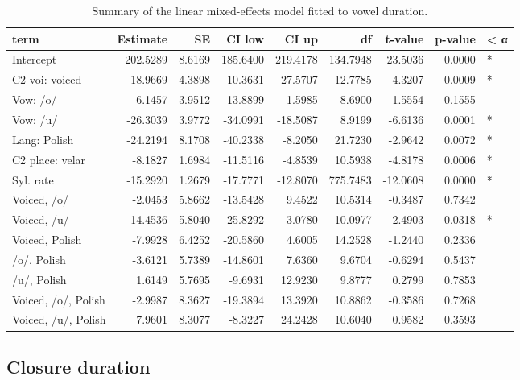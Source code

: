 \documentclass[preprint]{JASAnew}
\begin{document}
\begin{table}

\caption{\label{tab:vow-table}Summary of the linear mixed-effects model fitted to vowel duration.}
\centering
\begin{tabular}[t]{lrrrrrrrl}
\toprule
term & Estimate & SE & CI low & CI up & df & t-value & p-value & < α\\
\midrule
Intercept & 202.5289 & 8.6169 & 185.6400 & 219.4178 & 134.7948 & 23.5036 & 0.0000 & *\\
C2 voi: voiced & 18.9669 & 4.3898 & 10.3631 & 27.5707 & 12.7785 & 4.3207 & 0.0009 & *\\
Vow: /o/ & -6.1457 & 3.9512 & -13.8899 & 1.5985 & 8.6900 & -1.5554 & 0.1555 & \\
Vow: /u/ & -26.3039 & 3.9772 & -34.0991 & -18.5087 & 8.9199 & -6.6136 & 0.0001 & *\\
Lang: Polish & -24.2194 & 8.1708 & -40.2338 & -8.2050 & 21.7230 & -2.9642 & 0.0072 & *\\
\addlinespace
C2 place: velar & -8.1827 & 1.6984 & -11.5116 & -4.8539 & 10.5938 & -4.8178 & 0.0006 & *\\
Syl. rate & -15.2920 & 1.2679 & -17.7771 & -12.8070 & 775.7483 & -12.0608 & 0.0000 & *\\
Voiced, /o/ & -2.0453 & 5.8662 & -13.5428 & 9.4522 & 10.5314 & -0.3487 & 0.7342 & \\
Voiced, /u/ & -14.4536 & 5.8040 & -25.8292 & -3.0780 & 10.0977 & -2.4903 & 0.0318 & *\\
Voiced, Polish & -7.9928 & 6.4252 & -20.5860 & 4.6005 & 14.2528 & -1.2440 & 0.2336 & \\
\addlinespace
/o/, Polish & -3.6121 & 5.7389 & -14.8601 & 7.6360 & 9.6704 & -0.6294 & 0.5437 & \\
/u/, Polish & 1.6149 & 5.7695 & -9.6931 & 12.9230 & 9.8777 & 0.2799 & 0.7853 & \\
Voiced, /o/, Polish & -2.9987 & 8.3627 & -19.3894 & 13.3920 & 10.8862 & -0.3586 & 0.7268 & \\
Voiced, /u/, Polish & 7.9601 & 8.3077 & -8.3227 & 24.2428 & 10.6040 & 0.9582 & 0.3593 & \\
\bottomrule
\end{tabular}
\end{table}

\hypertarget{closure-duration}{%
\subsection{Closure duration}\label{closure-duration}}
\end{document}
